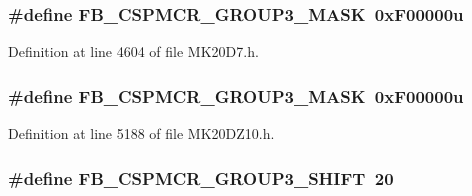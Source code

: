 \subsubsection[{\texorpdfstring{F\+B\+\_\+\+C\+S\+P\+M\+C\+R\+\_\+\+G\+R\+O\+U\+P3\+\_\+\+M\+A\+SK}{FB_CSPMCR_GROUP3_MASK}}]{\setlength{\rightskip}{0pt plus 5cm}\#define F\+B\+\_\+\+C\+S\+P\+M\+C\+R\+\_\+\+G\+R\+O\+U\+P3\+\_\+\+M\+A\+SK~0x\+F00000u}\hypertarget{group___f_b___register___masks_gac53d0fcbc3464725ceda1d20147fe98c}{}\label{group___f_b___register___masks_gac53d0fcbc3464725ceda1d20147fe98c}


Definition at line 4604 of file M\+K20\+D7.\+h.

\subsubsection[{\texorpdfstring{F\+B\+\_\+\+C\+S\+P\+M\+C\+R\+\_\+\+G\+R\+O\+U\+P3\+\_\+\+M\+A\+SK}{FB_CSPMCR_GROUP3_MASK}}]{\setlength{\rightskip}{0pt plus 5cm}\#define F\+B\+\_\+\+C\+S\+P\+M\+C\+R\+\_\+\+G\+R\+O\+U\+P3\+\_\+\+M\+A\+SK~0x\+F00000u}\hypertarget{group___f_b___register___masks_gac53d0fcbc3464725ceda1d20147fe98c}{}\label{group___f_b___register___masks_gac53d0fcbc3464725ceda1d20147fe98c}


Definition at line 5188 of file M\+K20\+D\+Z10.\+h.

\subsubsection[{\texorpdfstring{F\+B\+\_\+\+C\+S\+P\+M\+C\+R\+\_\+\+G\+R\+O\+U\+P3\+\_\+\+S\+H\+I\+FT}{FB_CSPMCR_GROUP3_SHIFT}}]{\setlength{\rightskip}{0pt plus 5cm}\#define F\+B\+\_\+\+C\+S\+P\+M\+C\+R\+\_\+\+G\+R\+O\+U\+P3\+\_\+\+S\+H\+I\+FT~20}\hypertarget{group___f_b___register___masks_ga9f0b849b6cb1a2f629dcd23a0a0a4306}{}\label{group___f_b___register___masks_ga9f0b849b6cb1a2f629dcd23a0a0a4306}


